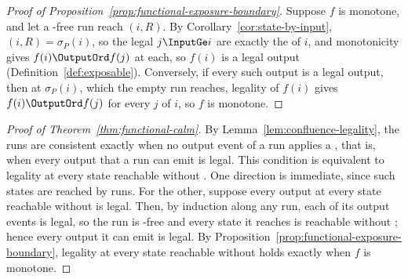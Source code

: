 \begin{proof}[Proof of Proposition~\ref{prop:functional-exposure-boundary}]
Suppose $f$ is monotone, and let a \commitment-free run reach $(i,R)$.  By Corollary~\ref{cor:state-by-input},
$(i,R)=\sigma_P(i)$, so the legal $j\InputGe i$ are exactly the \indescs of
$i$, and monotonicity gives $f(i)\OutputOrd f(j)$ at each, so $f(i)$ is a
legal output (Definition~\ref{def:exposable}).
Conversely, if every such output is a legal output, then at $\sigma_P(i)$,
which the empty run reaches, legality of $f(i)$ gives $f(i)\OutputOrd f(j)$
for every \indesc $j$ of $i$, so $f$ is monotone.
\end{proof}

\begin{proof}[Proof of Theorem~\ref{thm:functional-calm}]
By Lemma~\ref{lem:confluence-legality}, the runs are consistent exactly when
no output event of a run applies a \commitment, that is, when every output that
a run can emit is legal.  This condition is equivalent to
legality at every state reachable without \commitment.  One direction is
immediate, since such states are reached by runs.  For the other, suppose every
output at every state reachable without \commitment is legal.  Then, by
induction along any run, each of its output events is legal, so the run is
\commitment-free and every state it reaches is reachable without \commitment;
hence every output it can emit is legal.  By
Proposition~\ref{prop:functional-exposure-boundary}, legality at every state
reachable without \commitment holds exactly when $f$ is monotone.
\end{proof}
